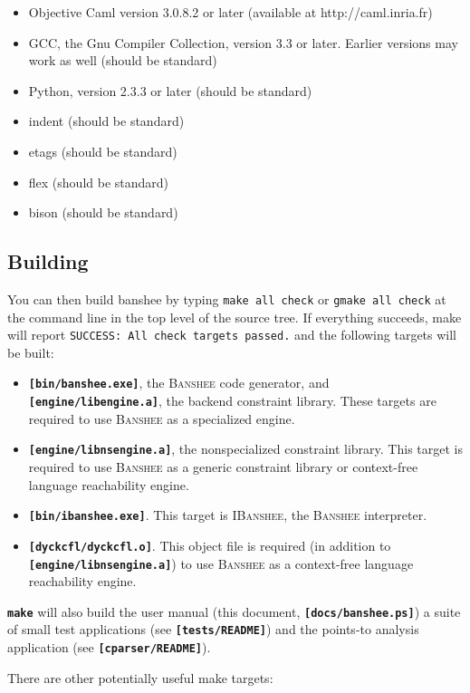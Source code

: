 \documentclass{article}
\newcommand{\banshee}{\textsc{Banshee}}
\newcommand{\ibanshee}{\textsc{IBanshee}}
\newcommand{\file}[1]{\texttt{\textbf{[#1]}}}
\newcommand{\cmd}[1]{\texttt{\textbf{#1}}}
\begin{document}
\begin{itemize}
\item Objective Caml version 3.0.8.2 or later (available at
  http://caml.inria.fr)
\item GCC, the Gnu Compiler Collection, version 3.3 or later. Earlier
  versions may work as well (should be standard)
\item Python, version 2.3.3 or later (should be standard)
\item indent (should be standard)
\item etags (should be standard)
\item flex (should be standard)
\item bison (should be standard)
\end{itemize}

\subsection{Building}

You can then build banshee by typing \texttt{make all check} or
\texttt{gmake all check} at the command line in the top level of the
source tree. If everything succeeds, make will report \texttt{SUCCESS:
  All check targets passed.} and the following targets will be built:

\begin{itemize}
\item \file{bin/banshee.exe}, the \banshee{} code generator, and
  \file{engine/libengine.a}, the backend constraint library. These
  targets are required to use \banshee{} as a specialized engine.
\item \file{engine/libnsengine.a}, the nonspecialized constraint
  library. This target is required to use \banshee{} as a generic
  constraint library or context-free language reachability engine.
\item \file{bin/ibanshee.exe}. This target is \ibanshee{}, the
  \banshee{} interpreter.
\item \file{dyckcfl/dyckcfl.o}. This object file is required (in
  addition to \file{engine/libnsengine.a}) to use \banshee{} as a
  context-free language reachability engine.
\end{itemize}

\cmd{make} will also build the user manual (this document,
\file{docs/banshee.ps}) a suite of small test applications (see
\file{tests/README}) and the points-to analysis application (see
\file{cparser/README}).

There are other potentially useful make targets:
\end{document}
